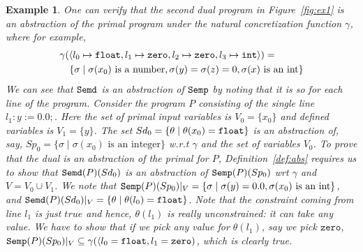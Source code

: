 \documentclass[preprint]{sig-alternate-05-2015}
\newtheorem{example}{Example}
\def\semp{{\tt{Semp}}}
\def\semd{{\tt{Semd}}}
\def\zero{{\tt{zero}}}
\def\float{{\tt{float}}}
\def\int{{\tt{int}}}
\def\ds{{\mathit{\theta}}}   %
\def\zero{{\mathtt{zero}}}
\begin{document}
\begin{example}
  One can verify that the second dual program in Figure~\ref{fig:ex1} is
  an abstraction of the primal program 
  under the
  natural concretization function $\gamma$, where for example,
  \begin{eqnarray*}
    \lefteqn{\gamma(\langle l_0 \mapsto \float, 
                 l_1 \mapsto \zero, 
                 l_2\mapsto \zero, 
               l_3\mapsto \int\rangle) = }
                 \\ &&
                 \{\sigma\mid \sigma(x_0) \mbox{ is a number},
                   \sigma(y)=\sigma(z)=0, 
                 \sigma(x) \mbox{ is an int}\}
  \end{eqnarray*}
%
  We can see that $\semd$ is an abstraction of $\semp$ by noting that
  it is so for each line of the program.
  Consider the program $P$ consisting of the single line $l_1: y := 0.0;$. 
  Here the set of primal input variables is $V_0=\{x_0\}$ and 
  defined variables is $V_1=\{y\}$.
  The set $Sd_0 = \{\theta\mid \theta(x_0)=\float\}$ is an 
  abstraction of, say, 
  $Sp_0 = \{\sigma\mid\sigma(x_0)\mbox{ is an integer}\}$ w.r.t $\gamma$
  and the set of variables $V_0$.
  To prove that the dual is an abstraction of the primal for $P$,
  Definition~\ref{def:abs} requires us to show that $\semd(P)(Sd_0)$ is an
  abstraction of $\semp(P)(Sp_0)$ wrt $\gamma$ and $V=V_0\cup V_1$.
  We note that
  $\semp(P)(Sp_0)|_V = \{\sigma \mid \sigma(y)=0.0, \sigma(x_0) {\mbox{ is an int}}\}$,
  and
  $\semd(P)(Sd_0)|_V = \{\theta \mid \theta(l_0)=\float\}$.
  Note that the constraint coming from line $l_1$ is just $\mathit{true}$
  and hence, $\theta(l_1)$ is really unconstrained: it can take any value.
  We have to show that if we pick {\em{any}} value for $\theta(l_1)$, say
  we pick $\zero$, 
  $\semp(P)(Sp_0)|_V \subseteq \gamma(\langle l_0=\float,l_1=\zero)$,
  which is clearly true.

\end{example}
\end{document}
